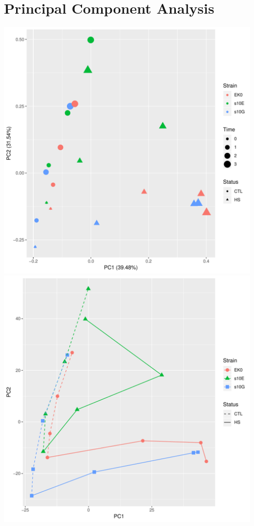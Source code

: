 \documentclass{article}\usepackage[]{graphicx}\usepackage[]{color}
\newenvironment{knitrout}{}{} %
\begin{document}
\section{Principal Component Analysis}
\begin{knitrout}
\color{fgcolor}

{\centering \includegraphics[width=1\linewidth]{figure/minimal-pcas-1} 
\includegraphics[width=1\linewidth]{figure/minimal-pcas-2} 

}



\end{knitrout}
\end{document}
